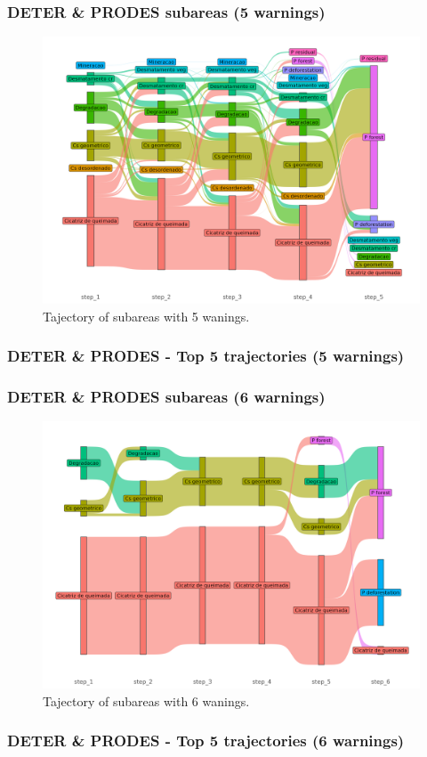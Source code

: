 \documentclass[aspectratio=169]{beamer}
\begin{document}
\begin{frame}
    \frametitle{DETER \& PRODES subareas (5 warnings)}
    \begin{figure}[h] 
        \includegraphics[width=0.65\linewidth]
        {./figures/plot_deter_prodes_subarea_trajectory_5.png}
        \caption{Tajectory of subareas with 5 wanings.}
        \label{fig:deter_prodes_subarea_trajectory_5}
    \end{figure}
\end{frame}

\begin{frame}[allowframebreaks]
    \frametitle{DETER \& PRODES - Top 5 trajectories (5 warnings)}
    
\end{frame}

\begin{frame}
    \frametitle{DETER \& PRODES subareas (6 warnings)}
    \begin{figure}[h] 
        \includegraphics[width=0.65\linewidth]
        {./figures/plot_deter_prodes_subarea_trajectory_6.png}
        \caption{Tajectory of subareas with 6 wanings.}
        \label{fig:deter_prodes_subarea_trajectory_6}
    \end{figure}
\end{frame}

\begin{frame}[allowframebreaks]
    \frametitle{DETER \& PRODES - Top 5 trajectories (6 warnings)}
    
\end{frame}
\end{document}
